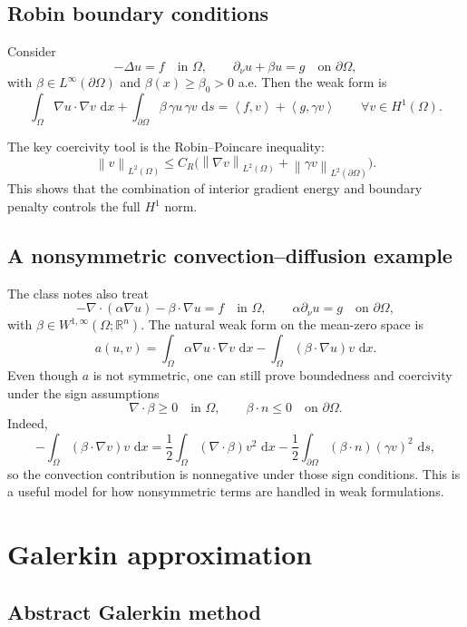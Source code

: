 \documentclass[11pt]{article}
\theoremstyle{definition}
\newcommand{\R}{\mathbb{R}}
\newcommand{\grad}{\nabla}
\newcommand{\dd}{\,\mathrm{d}}
\newcommand{\ip}[2]{\left\langle #1,#2\right\rangle}
\newcommand{\norm}[1]{\left\lVert #1\right\rVert}
\begin{document}
\subsection{Robin boundary conditions}

Consider
\[
-\Delta u=f \quad \text{in } \Omega,
\qquad \partial_\nu u + \beta u = g \quad \text{on } \partial\Omega,
\]
with $\beta\in L^\infty(\partial\Omega)$ and $\beta(x)\ge \beta_0>0$ a.e. Then the weak form is
\[
\int_\Omega \grad u\cdot\grad v\,\dd x + \int_{\partial\Omega} \beta\,\gamma u\,\gamma v\,\dd s
= \ip{f}{v}+\ip{g}{\gamma v}
\qquad \forall v\in H^1(\Omega).
\]

The key coercivity tool is the Robin--Poincare inequality:
\[
\norm{v}_{L^2(\Omega)} \le C_R\big(\norm{\grad v}_{L^2(\Omega)} + \norm{\gamma v}_{L^2(\partial\Omega)}\big).
\]
This shows that the combination of interior gradient energy and boundary penalty controls the full $H^1$ norm.

\subsection{A nonsymmetric convection--diffusion example}

The class notes also treat
\[
-\nabla\cdot(\alpha\nabla u) - \beta\cdot\nabla u = f \quad \text{in } \Omega,
\qquad \alpha\partial_\nu u = g \quad \text{on } \partial\Omega,
\]
with $\beta\in W^{1,\infty}(\Omega;\R^n)$. The natural weak form on the mean-zero space is
\[
a(u,v)=\int_\Omega \alpha\nabla u\cdot\nabla v\,\dd x - \int_\Omega (\beta\cdot\nabla u)v\,\dd x.
\]
Even though $a$ is not symmetric, one can still prove boundedness and coercivity under the sign assumptions
\[
\nabla\cdot\beta \ge 0 \quad \text{in } \Omega,
\qquad \beta\cdot n \le 0 \quad \text{on } \partial\Omega.
\]
Indeed,
\[
-\int_\Omega (\beta\cdot\nabla v)v\,\dd x
= \frac12 \int_\Omega (\nabla\cdot\beta) v^2\,\dd x
- \frac12 \int_{\partial\Omega} (\beta\cdot n)(\gamma v)^2\,\dd s,
\]
so the convection contribution is nonnegative under those sign conditions. This is a useful model for how nonsymmetric terms are handled in weak formulations.

\section{Galerkin approximation}

\subsection{Abstract Galerkin method}
\end{document}
